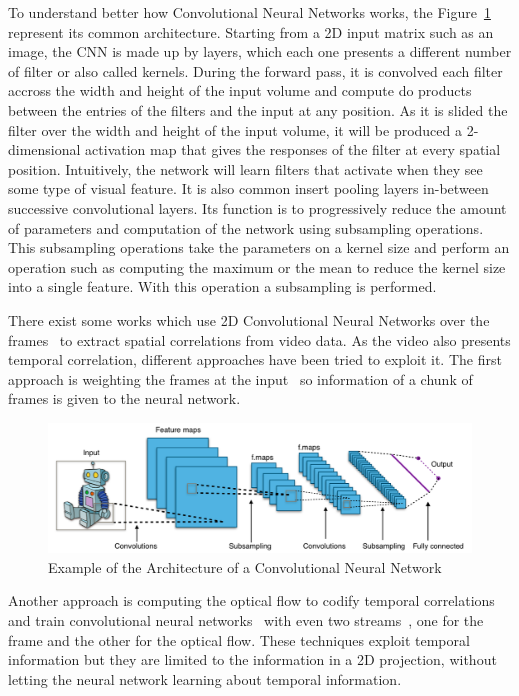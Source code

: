 To understand better how Convolutional Neural Networks works, the Figure~\ref{fig:cnn_architecture} represent its common architecture. Starting from a 2D input matrix such as an image, the CNN is made up by layers, which each one presents a different number of filter or also called kernels.
During the forward pass, it is convolved each filter accross the width and height of the input volume and compute do products between the entries of the filters and the input at any position. As it is slided the filter over the width and height of the input volume, it will be produced a 2-dimensional activation map that gives the responses of the filter at every spatial position.
Intuitively, the network will learn filters that activate when they see some type of visual feature. It is also common insert pooling layers in-between successive convolutional layers.
Its function is to progressively reduce the amount of parameters and computation of the network using subsampling operations. This subsampling operations take the parameters on a kernel size and perform an operation such as computing the maximum or the mean to reduce the kernel size into a single feature. With this operation a subsampling is performed.

There exist some works which use 2D Convolutional Neural Networks over the frames~\cite{gkioxari2015contextual,yeung2015end,ballas2015delving} to extract spatial correlations from video data. As the video also presents temporal correlation, different approaches have been tried to exploit it. The first approach is weighting the frames at the input~\cite{yeung2015every} so information of a chunk of frames is given to the neural network.

\begin{figure}[ht]
\begin{center}
\includegraphics[width=1\linewidth]{img/stateofart/cnn_architecture}
\end{center}
\caption{Example of the Architecture of a Convolutional Neural Network}
\label{fig:cnn_architecture}
\end{figure}

Another approach is computing the optical flow to codify temporal correlations and train convolutional neural networks~\cite{simonyan2014two,Ng_2015_CVPR} with even two streams~\cite{wang2015towards}, one for the frame and the other for the optical flow. These techniques exploit temporal information but they are limited to the information in a 2D projection, without letting the neural network learning about temporal information.


